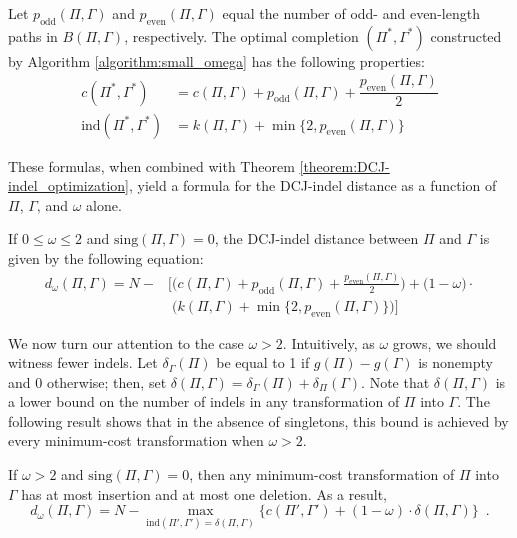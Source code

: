 \noindent Let $p_{\mathrm{odd}}(\Pi, \Gamma)$ and $p_{\mathrm{even}}(\Pi, \Gamma)$ equal the number of odd- and even-length paths in $B(\Pi, \Gamma)$, respectively.  The optimal completion $(\Pi^{*}, \Gamma^{*})$ constructed by Algorithm \ref{algorithm:small_omega} has the following properties:
\begin{align}
c(\Pi^{*}, \Gamma^{*}) & = c(\Pi, \Gamma) + p_{\mathrm{odd}}(\Pi, \Gamma) + \dfrac{p_{\mathrm{even}}(\Pi, \Gamma)}{2} \label{equation:small_omega_optimal_completion_cycles} \\
\mathrm{ind}(\Pi^{*}, \Gamma^{*}) & = k(\Pi, \Gamma) + \min{\{2, p_{\mathrm{even}}(\Pi, \Gamma)\}} \label{equation:small_omega_optimal_completion_indels}
\end{align}

\noindent These formulas, when combined with Theorem \ref{theorem:DCJ-indel_optimization}, yield a formula for the DCJ-indel distance as a function of $\Pi$, $\Gamma$, and $\omega$ alone.

\begin{corollary}
If $0 \leq \omega \leq 2$ and $\mathrm{sing}(\Pi, \Gamma) = 0$, the DCJ-indel distance between $\Pi$ and $\Gamma$ is given by the following equation:
\begin{equation}
\begin{split}
d_{\omega}(\Pi, \Gamma) = N - & \bigg[ \Big(c(\Pi, \Gamma) + p_{\mathrm{odd}}(\Pi, \Gamma) + \frac{p_{\mathrm{even}}(\Pi, \Gamma)}{2}\Big) + \Big(1 - \omega\Big) \cdot  \\
&  \phantom{[} \Big(k(\Pi, \Gamma) + \min{\big\{2, p_{\mathrm{even}}(\Pi, \Gamma)\big\}}\Big) \bigg]
\end{split}
\label{equation:small_omega_distance}
\end{equation}
\label{corollary:small_omega_distance}
\end{corollary}

\noindent We now turn our attention to the case $\omega > 2$.  Intuitively, as $\omega$ grows, we should witness fewer indels. Let $\delta_{\Gamma}(\Pi)$ be equal to 1 if $g(\Pi) - g(\Gamma)$ is nonempty and 0 otherwise; then, set $\delta(\Pi, \Gamma) = \delta_{\Gamma}(\Pi) + \delta_{\Pi}(\Gamma)$.  Note that $\delta(\Pi, \Gamma)$ is a lower bound on the number of indels in any transformation of $\Pi$ into $\Gamma$.  The following result shows that in the absence of singletons, this bound is achieved by every minimum-cost transformation when $\omega > 2$.

\begin{theorem}
If $\omega > 2$ and $\mathrm{sing}(\Pi, \Gamma) = 0$, then any minimum-cost transformation of $\Pi$ into $\Gamma$ has at most insertion and at most one deletion. As a result,
\begin{equation}
d_{\omega}(\Pi, \Gamma) = N - \max_{\mathrm{ind}(\Pi', \Gamma') = \delta(\Pi, \Gamma)}{\{c(\Pi', \Gamma') + (1 - \omega) \cdot \delta(\Pi, \Gamma)\}}\enspace.
\label{equation:one_indel}
\end{equation}
\label{theorem:one_indel}
\end{theorem}
\vspace{-1.5\baselineskip}

